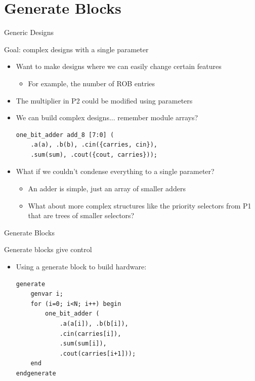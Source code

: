 \documentclass[table,dvipsnames]{beamer}
\begin{document}
  \section{Generate Blocks}
    \begin{frame}[fragile]{Generic Designs}
	\begin{block}{Goal: complex designs with a single parameter}
		\begin{itemize}
			\item Want to make designs where we can easily change certain features
			\begin{itemize}
				\item For example, the number of ROB entries
			\end{itemize}
			\item The multiplier in P2 could be modified using parameters
			\item We can build complex designs... remember module arrays?
			 \begin{verbatim}
one_bit_adder add_8 [7:0] (
	.a(a), .b(b), .cin({carries, cin}), 
	.sum(sum), .cout({cout, carries}));
			\end{verbatim}
			
			
			\item \color{Black} What if we couldn't condense everything to a single parameter?
			\begin{itemize}
				\item An adder is simple, just an array of smaller adders
				\item What about more complex structures like the priority selectors from P1 that are trees of smaller selectors?
			\end{itemize}
		\end{itemize}
	\end{block}
\end{frame}
 

     \begin{frame}[fragile]{Generate Blocks}
	\begin{block}{Generate blocks give control}
		\begin{itemize}
			\item Using a generate block to build hardware:
			\begin{verbatim}
generate
	genvar i;
	for (i=0; i<N; i++) begin
		one_bit_adder (
			.a(a[i]), .b(b[i]), 
			.cin(carries[i]), 
			.sum(sum[i]), 
			.cout(carries[i+1]));
	end
endgenerate
			\end{verbatim}
			\end{itemize}
	\end{block}
\end{frame}
 
\end{document}

